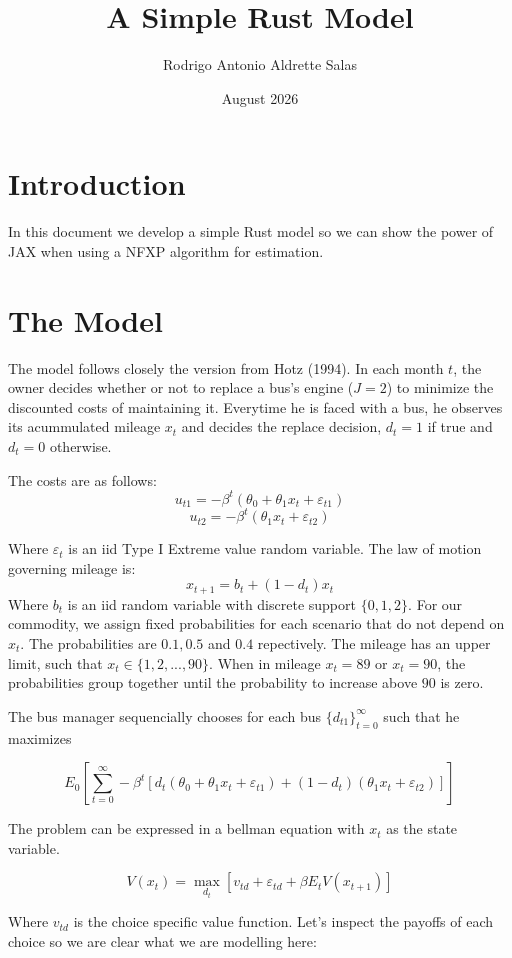 \documentclass{article}
\title{A Simple Rust Model}
\author{Rodrigo Antonio Aldrette Salas}
\date{August 2026}
\begin{document}
\maketitle

\section{Introduction}
In this document we develop a simple Rust model so we can show the power of JAX when using a NFXP algorithm for estimation.


\section{The Model}

The model follows closely the version from Hotz (1994). In each month $t$, the owner decides whether or not to replace a bus's engine ($J=2$) to minimize the discounted costs of maintaining it. Everytime he is faced with a bus, he observes its acummulated mileage $x_t$ and decides the replace decision, $d_t=1$ if true and $d_t=0$ otherwise.

The costs are as follows:
$$u_{t1}=-\beta^t(\theta_0 +\theta_1 x_t+\varepsilon_{t1})$$
$$u_{t2}=-\beta^t(\theta_1 x_t+\varepsilon_{t2})$$

Where $\varepsilon_{t}$ is an iid Type I Extreme value random variable. The law of motion governing mileage is:
$$x_{t+1}=b_t+(1-d_t)x_t$$
Where $b_t$ is an iid random variable with discrete support $\{0, 1, 2\}$. For our commodity, we assign fixed probabilities for each scenario that do not depend on $x_t$. The probabilities are $0.1,0.5$ and $0.4$ repectively. The mileage has an upper limit, such that $x_t\in \{1, 2, ...,90\}$. When in mileage $x_t=89$ or $x_t=90$, the probabilities group together until the probability to increase above $90$ is zero.

The bus manager sequencially chooses for each bus $\{d_{t1}\}_{t=0}^{\infty}$ such that he maximizes

$$E_0\left[\sum_{t=0}^{\infty}-\beta^{t}[d_t(\theta_0 +\theta_1 x_t+\varepsilon_{t1})+(1-d_{t})(\theta_1 x_t+\varepsilon_{t2})]\right]$$

The problem can be expressed in a bellman equation with $x_t$ as the state variable.

$$V(x_t)=\max_{d_t}\left[ v_{td}+\varepsilon_{td} +\beta E_t V(x_{t+1}) \right]$$

Where $v_{td}$ is the choice specific value function. Let's inspect the payoffs of each choice so we are clear what we are modelling here:
\end{document}

